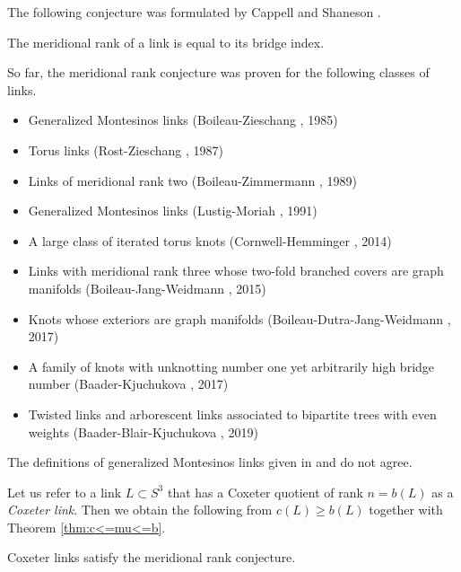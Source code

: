 \documentclass[main.tex]{subfiles}
\begin{document}
The following conjecture was formulated by Cappell and Shaneson \cite{cappell1978}.

\begin{conjecture}
The meridional rank of a link is equal to its bridge index.
\end{conjecture}

\begin{remark} \label{rem:previous-results}
So far, the meridional rank conjecture was proven for the following classes of links.

\begin{itemize}
\itemsep0em
\item Generalized Montesinos links (Boileau-Zieschang \cite{zieschang1985}, 1985)
\item Torus links (Rost-Zieschang \cite{rost1987}, 1987)
\item Links of meridional rank two (Boileau-Zimmermann \cite{boileau1989}, 1989)
\item Generalized Montesinos links (Lustig-Moriah \cite{lustig1993}, 1991)
\item A large class of iterated torus knots (Cornwell-Hemminger \cite{cornwell2014}, 2014)
\item Links with meridional rank three whose two-fold branched
covers are graph manifolds (Boileau-Jang-Weidmann \cite{boileau2015}, 2015)
\item Knots whose exteriors are graph manifolds (Boileau-Dutra-Jang-Weidmann \cite{boileau2017}, 2017)
\item A family of knots with unknotting number one yet arbitrarily high
bridge number (Baader-Kjuchukova \cite{baader2017}, 2017)
\item Twisted links and arborescent
links associated to bipartite trees with even weights (Baader-Blair-Kjuchukova \cite{baader2019}, 2019)
\end{itemize}

The definitions of generalized Montesinos links given in \cite{zieschang1985} and \cite{lustig1993} do not agree.

\end{remark}

Let us refer to a link $L \subset S^3$ that has a Coxeter quotient of rank $n = b(L)$ as a \textit{Coxeter link}. Then we obtain the following from $c(L) \geq b(L)$ together with Theorem \ref{thm:c<=mu<=b}.


\begin{corollary}\label{cor:coxeter-links-meridional-rank}
Coxeter links satisfy the meridional rank conjecture.
\end{corollary}
\end{document}
